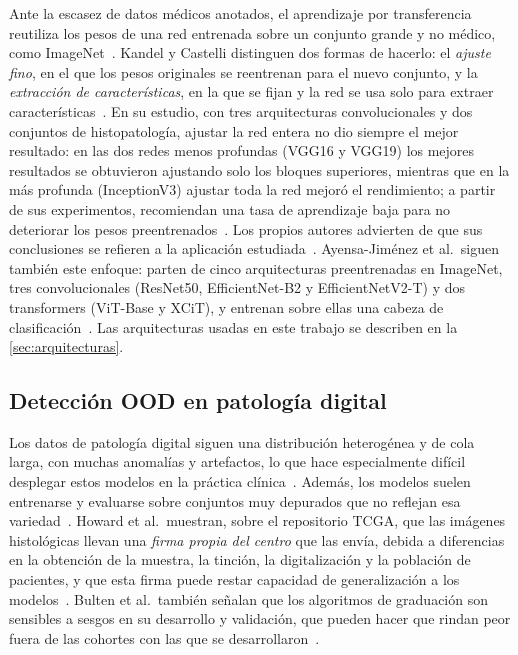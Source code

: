 Ante la escasez de datos médicos anotados, el aprendizaje por transferencia
reutiliza los pesos de una red entrenada sobre un conjunto grande y no médico,
como ImageNet~\cite{kandel2020}. Kandel y Castelli distinguen dos formas de
hacerlo: el \emph{ajuste fino}, en el que los pesos originales se reentrenan para
el nuevo conjunto, y la \emph{extracción de características}, en la que se fijan
y la red se usa solo para extraer
características~\cite{kandel2020}. En su estudio, con tres arquitecturas
convolucionales y dos conjuntos de histopatología, ajustar la red entera no dio
siempre el mejor resultado: en las dos redes menos profundas (VGG16 y VGG19) los
mejores resultados se obtuvieron ajustando solo los bloques superiores, mientras
que en la más profunda (InceptionV3) ajustar toda la red mejoró el rendimiento; a
partir de sus experimentos, recomiendan una tasa de aprendizaje baja para no
deteriorar los pesos preentrenados~\cite{kandel2020}.
Los propios autores advierten de que sus conclusiones se refieren a la aplicación
estudiada~\cite{kandel2020}. Ayensa-Jiménez et al.\ siguen también este enfoque:
parten de cinco arquitecturas preentrenadas en ImageNet, tres convolucionales
(ResNet50, EfficientNet-B2 y EfficientNetV2-T) y dos transformers (ViT-Base y
XCiT), y entrenan sobre ellas una cabeza de clasificación~\cite{ayensa2026}. Las arquitecturas usadas en este
trabajo se describen en la \cref{sec:arquitecturas}.

\subsection{Detección OOD en patología digital}\label{sec:ea-ood-patologia}

Los datos de patología digital siguen una distribución heterogénea y de cola
larga, con muchas anomalías y artefactos, lo que hace especialmente difícil
desplegar estos modelos en la práctica clínica~\cite{linmans2023}. Además, los
modelos suelen entrenarse y evaluarse sobre conjuntos muy depurados que no
reflejan esa variedad~\cite{linmans2023}. Howard et al.\ muestran, sobre el
repositorio TCGA, que las imágenes histológicas llevan una \emph{firma propia del
centro} que las envía, debida a diferencias en la obtención de la muestra, la
tinción, la digitalización y la población de pacientes, y que esta firma puede
restar capacidad de generalización a los modelos~\cite{howard2021}. Bulten et
al.\ también señalan que los algoritmos de graduación son sensibles a sesgos en
su desarrollo y validación, que pueden hacer que rindan peor fuera de las
cohortes con las que se desarrollaron~\cite{bulten2022}.

